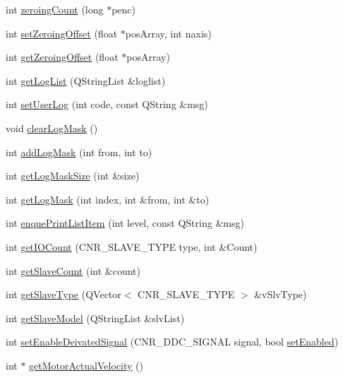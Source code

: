 \begin{DoxyCompactItemize}
int \hyperlink{classCUIApp_aaf099c230d05b323f5ab62c25ca040ba}{zeroing\-Count} (long $\ast$penc)
\item 
int \hyperlink{classCUIApp_a2936477854549f24236662a1967c0c78}{set\-Zeroing\-Offset} (float $\ast$pos\-Array, int naxis)
\item 
int \hyperlink{classCUIApp_ade2fe0edbcadb0d9c31e23db494033c3}{get\-Zeroing\-Offset} (float $\ast$pos\-Array)
\item 
int \hyperlink{classCUIApp_a02a5f7d94a6ca9ba0c050574e8fb9ee5}{get\-Log\-List} (Q\-String\-List \&loglist)
\item 
int \hyperlink{classCUIApp_abbe30c42f3161debd9c5b61c4afea678}{set\-User\-Log} (int code, const Q\-String \&msg)
\item 
void \hyperlink{classCUIApp_a803e0e51595b7d38ead94d1fe6cae849}{clear\-Log\-Mask} ()
\item 
int \hyperlink{classCUIApp_a29dc28296cfb8e9271cd0b77fa13789a}{add\-Log\-Mask} (int from, int to)
\item 
int \hyperlink{classCUIApp_a2590acef111dbbaa876de86ac1b323a5}{get\-Log\-Mask\-Size} (int \&size)
\item 
int \hyperlink{classCUIApp_ad4f668fddc3ba074f8006bc13b6fa445}{get\-Log\-Mask} (int index, int \&from, int \&to)
\item 
int \hyperlink{classCUIApp_a174d987f2079552ee55978771061dc9b}{enque\-Print\-List\-Item} (int level, const Q\-String \&msg)
\item 
int \hyperlink{classCUIApp_a997e16c024559902626cc6fc98c9ef6b}{get\-I\-O\-Count} (C\-N\-R\-\_\-\-S\-L\-A\-V\-E\-\_\-\-T\-Y\-P\-E type, int \&Count)
\item 
int \hyperlink{classCUIApp_a36a0dd9664cf48673640716277638e58}{get\-Slave\-Count} (int \&count)
\item 
int \hyperlink{classCUIApp_ada4c7ae52850321862eb34f6c3190af6}{get\-Slave\-Type} (Q\-Vector$<$ C\-N\-R\-\_\-\-S\-L\-A\-V\-E\-\_\-\-T\-Y\-P\-E $>$ \&v\-Slv\-Type)
\item 
int \hyperlink{classCUIApp_aef270c9f46a09ee42c4a6213e6a0ef3f}{get\-Slave\-Model} (Q\-String\-List \&slv\-List)
\item 
int \hyperlink{classCUIApp_a3f28630e81a274fb998aec04e17992f2}{set\-Enable\-Deivated\-Signal} (C\-N\-R\-\_\-\-D\-D\-C\-\_\-\-S\-I\-G\-N\-A\-L signal, bool \hyperlink{classCUIApp_a0bb9aaecc950f991d3ecc69e5895e9e6}{set\-Enabled})
\item 
int $\ast$ \hyperlink{classCUIApp_a4a20047ab2d7ec753785db2b4b955666}{get\-Motor\-Actual\-Velocity} ()

\end{DoxyCompactItemize}
